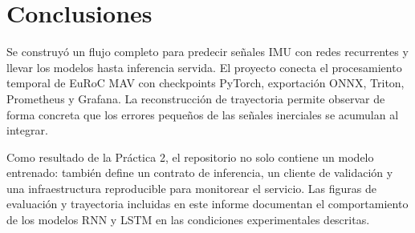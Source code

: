 \documentclass[11pt,a4paper]{article}
\begin{document}
\section{Conclusiones}

Se construy\'o un flujo completo para predecir se\~nales IMU con redes
recurrentes y llevar los modelos hasta inferencia servida. El proyecto conecta
el procesamiento temporal de EuRoC MAV con checkpoints PyTorch, exportaci\'on
ONNX, Triton, Prometheus y Grafana. La reconstrucci\'on de trayectoria permite
observar de forma concreta que los errores peque\~nos de las se\~nales inerciales
se acumulan al integrar.

Como resultado de la Pr\'actica 2, el repositorio no solo contiene un modelo
entrenado: tambi\'en define un contrato de inferencia, un cliente de validaci\'on
y una infraestructura reproducible para monitorear el servicio. Las figuras
de evaluaci\'on y trayectoria incluidas en este informe documentan el
comportamiento de los modelos RNN y LSTM en las condiciones experimentales
descritas.
\end{document}
